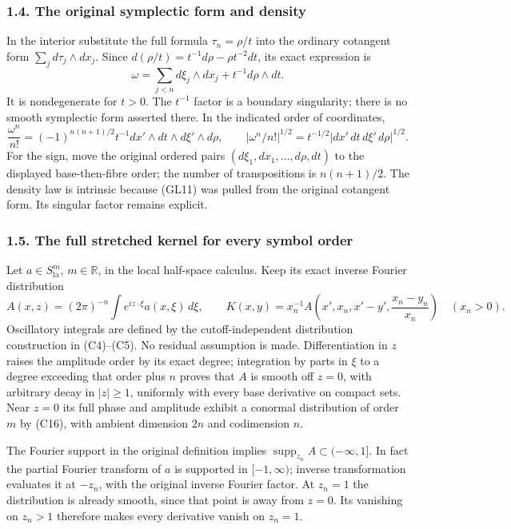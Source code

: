 \documentclass[
  11pt,
]{article}
\begin{document}
\subsubsection{1.4. The original symplectic form and
density}\label{the-original-symplectic-form-and-density}

In the interior substitute the full formula \(\tau_n=\rho/t\) into the
ordinary cotangent form \(\sum_j d\tau_j\wedge dx_j\). Since
\(d(\rho/t)=t^{-1}d\rho-\rho t^{-2}dt\), its exact expression is \[
 \omega=\sum_{j<n}d\xi_j\wedge dx_j+t^{-1}d\rho\wedge dt .
 \tag{GL11}
\] It is nondegenerate for \(t>0\). The \(t^{-1}\) factor is a boundary
singularity; there is no smooth symplectic form asserted there. In the
indicated order of coordinates, \[
 \frac{\omega^n}{n!}
 =(-1)^{n(n+1)/2}t^{-1}
       dx'\wedge dt\wedge d\xi'\wedge d\rho,\qquad
 |\omega^n/n!|^{1/2}
 =t^{-1/2}|dx'\,dt\,d\xi'\,d\rho|^{1/2}.
 \tag{GL12}
\] For the sign, move the original ordered pairs
\((d\xi_1,dx_1,\ldots,d\rho,dt)\) to the displayed base-then-fibre
order; the number of transpositions is \(n(n+1)/2\). The density law is
intrinsic because (GL11) was pulled from the original cotangent form.
Its singular factor remains explicit.

\subsubsection{1.5. The full stretched kernel for every symbol
order}\label{the-full-stretched-kernel-for-every-symbol-order}

Let \(a\in S_{\mathrm{la}}^m\), \(m\in\mathbb R\), in the local
half-space calculus. Keep its exact inverse Fourier distribution \[
 A(x,z)=(2\pi)^{-n}\int e^{iz\cdot\xi}a(x,\xi)\,d\xi,\qquad
 K(x,y)=x_n^{-1}
       A\left(x',x_n,x'-y',\frac{x_n-y_n}{x_n}\right)
       \quad(x_n>0).
 \tag{GL13}
\] Oscillatory integrals are defined by the cutoff-independent
distribution construction in (C4)--(C5). No residual assumption is made.
Differentiation in \(z\) raises the amplitude order by its exact degree;
integration by parts in \(\xi\) to a degree exceeding that order plus
\(n\) proves that \(A\) is smooth off \(z=0\), with arbitrary decay in
\(|z|\ge1\), uniformly with every base derivative on compact sets. Near
\(z=0\) its full phase and amplitude exhibit a conormal distribution of
order \(m\) by (C16), with ambient dimension \(2n\) and codimension
\(n\).

The Fourier support in the original definition implies
\(\operatorname{supp}_{z_n}A\subset(-\infty,1]\). In fact the partial
Fourier transform of \(a\) is supported in \([-1,\infty)\); inverse
transformation evaluates it at \(-z_n\), with the original inverse
Fourier factor. At \(z_n=1\) the distribution is already smooth, since
that point is away from \(z=0\). Its vanishing on \(z_n>1\) therefore
makes every derivative vanish on \(z_n=1\).
\end{document}
